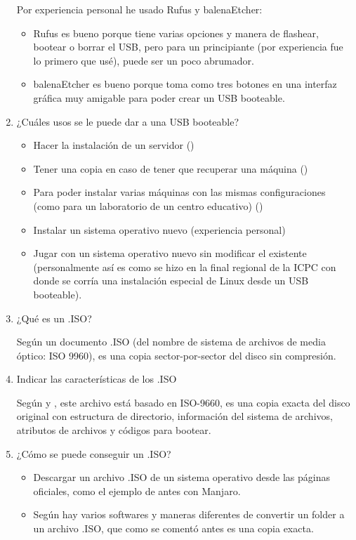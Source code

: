 \documentclass[stu, 12pt, letterpaper, donotrepeattitle, floatsintext, natbib, helv]{apa7}
\begin{document}
\begin{enumerate}
    Por experiencia personal he usado Rufus y balenaEtcher:
    \begin{itemize}
        \item Rufus es bueno porque tiene varias opciones y manera de flashear, bootear o borrar el USB, pero para un principiante (por experiencia fue lo primero que usé), puede ser un poco abrumador.
        \item balenaEtcher es bueno porque toma como tres botones en una interfaz gráfica muy amigable para poder crear un USB booteable.
    \end{itemize}
    \item ¿Cuáles usos se le puede dar a una USB booteable? 
    \begin{itemize}
        \item Hacer la instalación de un servidor (\cite{CreateABootableDriveWindows})
        \item Tener una copia en caso de tener que recuperar una máquina (\cite{CreateABootableDriveWindows})
        \item Para poder instalar varias máquinas con las mismas configuraciones (como para un laboratorio de un centro educativo) (\cite{WhatIsABootableDrive})
        \item Instalar un sistema operativo nuevo (experiencia personal)
        \item Jugar con un sistema operativo nuevo sin modificar el existente (personalmente así es como se hizo en la final regional de la ICPC con donde se corría una instalación especial de Linux desde un USB booteable).
    \end{itemize}
    \item ¿Qué es un .ISO? 
    
    Según \cite{WhatIsAnISO} un documento .ISO (del nombre de sistema de archivos de media óptico: ISO 9960), es una copia sector-por-sector del disco sin compresión.
    \item Indicar las características de los .ISO 
    Según \cite{WhatIsAnISO} y \cite{FileExtension}, este archivo está basado en ISO-9660, es una copia exacta del disco original con estructura de directorio, información del sistema de archivos, atributos de archivos y códigos para bootear.
    

    \item ¿Cómo se puede conseguir un .ISO? 
    \begin{itemize}
        \item Descargar un archivo .ISO de un sistema operativo desde las páginas oficiales, como el ejemplo de antes con Manjaro.
        \item Según \cite{ISOConverters} hay varios softwares y maneras diferentes de convertir un folder a un archivo .ISO, que como se comentó antes es una copia exacta.
    \end{itemize}

\end{enumerate}
\end{document}
